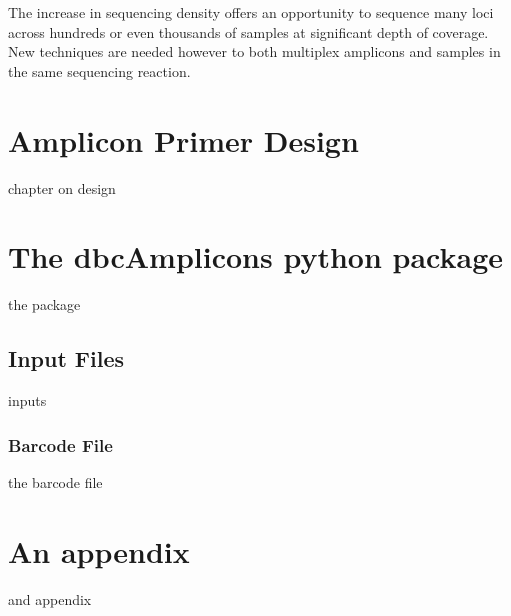 \documentclass[10pt,oneside]{memoir}
\begin{document}
The increase in sequencing density offers an opportunity to sequence many loci across hundreds or even thousands of samples at significant depth of coverage. New techniques are needed however to both multiplex amplicons and samples in the same sequencing reaction.

\clearpage

\tableofcontents

\clearpage


\mainmatter

\chapter{Amplicon Primer Design}
chapter on design
\chapter{The dbcAmplicons python package}
the package
\section{Input Files}
inputs
\subsection{Barcode File}
the barcode file

\appendix
\chapter{An appendix}
and appendix

\backmatter
\end{document}
